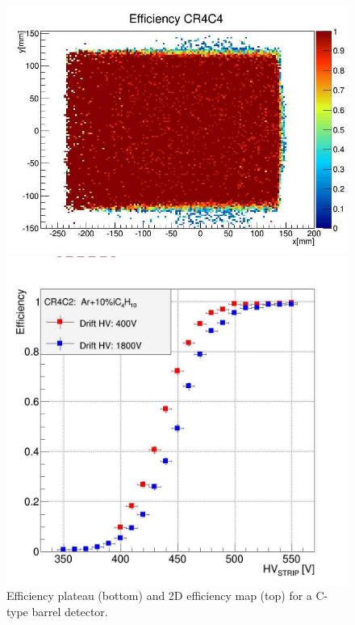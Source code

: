\begin{figure}[htb]
 \includegraphics[width=1.0\columnwidth,keepaspectratio]{images/Eff_2D}
 
 \includegraphics[width=1.0\columnwidth,keepaspectratio]{images/Plateau_HV}
 
 \caption{Efficiency plateau (bottom) and 2D efficiency map (top) for a C-type barrel detector.}
 \label{fig:mm-fig8}
\end{figure}


